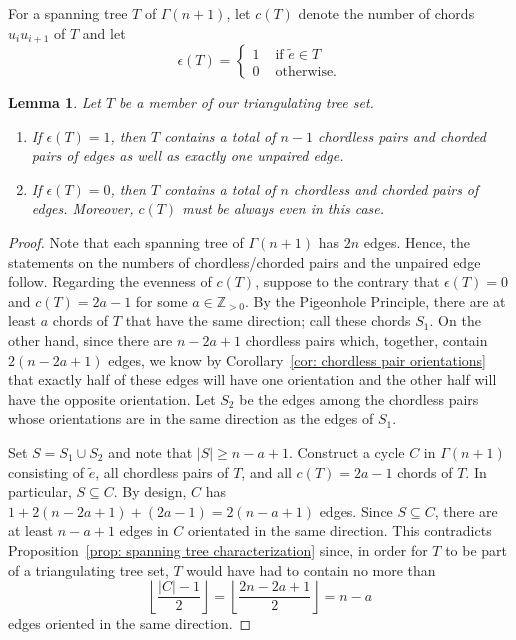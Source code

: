 \documentclass{amsart}
\numberwithin{equation}{section}
\theoremstyle{plain}
\newtheorem{lem}[thm]{Lemma}
\theoremstyle{definition}
\newcommand{\ZZ}{\mathbb{Z}}
\newcommand{\etilde}{\widetilde{e}}
\begin{document}
For a spanning tree $T$ of $\Gamma(n+1)$, let $c(T)$ denote the number of chords $u_iu_{i+1}$ of $T$ and let 
\[
    \epsilon(T) = 
        \begin{cases}
            1 & \text{ if } \etilde \in T \\
            0 & \text{ otherwise.}
        \end{cases}
\]

\begin{lem}\label{lem: feasible trees}
    Let $T$ be a member of our triangulating tree set. 
    \begin{enumerate}[label={\rm (\roman*)}]
        \item If $\epsilon(T)=1$, then $T$ contains a total of $n-1$ chordless pairs and chorded pairs of edges as well as exactly one unpaired edge. 
        \item If $\epsilon(T)=0$, then $T$ contains a total of $n$ chordless and chorded pairs of edges. Moreover, $c(T)$ must be always even in this case.  
    \end{enumerate}
\end{lem}
\begin{proof}
    Note that each spanning tree of $\Gamma(n+1)$ has $2n$ edges. Hence, the statements on the numbers of chordless/chorded pairs and the unpaired edge follow. 
    Regarding the evenness of $c(T)$, suppose to the contrary that
    $\epsilon(T)=0$ and $c(T)=2a-1$ for some $a \in \ZZ_{>0}$. 
    By the Pigeonhole Principle, there are at least $a$ chords of $T$ that have the same direction; call these chords $S_1$.
    On the other hand, since there are $n-2a+1$ chordless pairs which, together, contain $2(n-2a+1)$ edges, we know by 
    Corollary~\ref{cor: chordless pair orientations} that exactly half of these edges will have one orientation and the other half will have the opposite orientation.
    Let $S_2$ be the edges among the chordless pairs whose orientations are in the same direction as the edges of $S_1$.

    Set $S = S_1 \cup S_2$ and note that $|S| \ge n-a+1$.
    Construct a cycle $C$ in $\Gamma(n+1)$ consisting of $\etilde$, all chordless pairs of $T$, and all $c(T) = 2a - 1$ chords of $T$. 
    In particular, $S \subseteq C$.
    By design, $C$ has $1 + 2(n-2a+1) + (2a-1) =2(n-a+1)$ edges.
    Since $S \subseteq C$, there are at least $n-a+1$ edges in $C$ orientated in the same direction.
    This contradicts Proposition~\ref{prop: spanning tree characterization} since, in order for $T$ to be part of a triangulating tree set, $T$ would have had to contain no more than
    \[
        \left\lfloor\frac{|C|-1}{2}\right\rfloor = \left\lfloor\frac{2n-2a+1}{2}\right\rfloor = n - a
    \]
    edges oriented in the same direction.
\end{proof}
\end{document}
